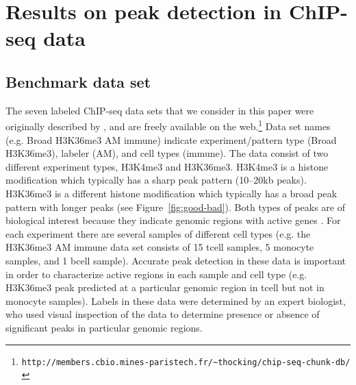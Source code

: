 \documentclass[twoside,11pt]{article}
\begin{document}
\section{Results on peak detection in ChIP-seq data}
\label{sec:results-chip-seq}
\label{sec:results}

\subsection{Benchmark data set}

The seven labeled ChIP-seq data sets that we consider in this paper were originally
described by \citet{HOCKING2016-chipseq}, and are freely available on
the
web.\footnote{\verb|http://members.cbio.mines-paristech.fr/~thocking/chip-seq-chunk-db/|}
Data set names (e.g. Broad H3K36me3 AM immune) indicate
experiment/pattern type (Broad H3K36me3), labeler (AM), and cell types
(immune). The data consist of two different experiment types, H3K4me3
and H3K36me3. H3K4me3 is a histone modification which typically has a
sharp peak pattern (10--20kb peaks). H3K36me3 is a different histone
modification which typically has a broad peak pattern with longer
peaks (see Figure~\ref{fig:good-bad}). Both types of peaks are of
biological interest because they indicate genomic regions with active
genes \citep{histone-review}. For each experiment there are several samples of different
cell types (e.g. the H3K36me3 AM immune data set consists of 15 tcell
samples, 5 monocyte samples, and 1 bcell sample). Accurate peak
detection in these data is important in order to characterize active
regions in each sample and cell type (e.g. H3K36me3 peak predicted at
a particular genomic region in tcell but not in monocyte samples).
Labels in these data were determined
by an expert biologist, who used visual inspection of the data to
determine presence or absence of significant peaks in particular
genomic regions. 
\end{document}
